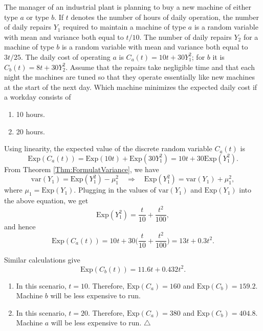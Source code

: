 \begin{example}
The manager of an industrial plant is planning to buy a new machine of either type $a$ or type $b$. If $t$ denotes the number of hours of daily operation, the number of daily repairs $Y_1$ required to maintain a machine of type $a$ is a random variable with mean and variance both equal to $t/10$. The number of daily repairs $Y_2$ for a machine of type $b$ is a random variable with mean and variance both equal to $3t/25$. The daily cost of operating $a$ is $C_a (t) = 10t + 30Y_1^2$; for $b$ it is $C_b(t) = 8t + 30 Y_2^2$. Assume that the repairs take negligible time and that each night the machines are tuned so that they operate essentially like new machines at the start of the next day. Which machine minimizes the expected daily cost if a workday consists of
    \begin{enumerate}[label=\alph*)]
    \item 10 hours.
    \item 20 hours.
    \end{enumerate}
\end{example}
\begin{sol*}
Using linearity, the expected value of the discrete random variable $C_a(t)$ is
\[
    \mathrm{Exp} (C_a (t)) = \mathrm{Exp} (10t) + \mathrm{Exp} (30 Y_1^2) = 10t + 30 \mathrm{Exp} (Y_1^2) .
\]
From Theorem \ref{Thm:FormulatVariance}, we have
\[
    \mathrm{var} (Y_1) = \mathrm{Exp} (Y_1^2) - \mu_1^2 \quad \Rightarrow \quad \mathrm{Exp} (Y_1^2) = \mathrm{var} (Y_1) + \mu_1^2 ,
\]
where $\mu_1 = \mathrm{Exp} (Y_1)$. Plugging in the values of $\mathrm{var} (Y_1)$ and $\mathrm{Exp} (Y_1)$ into the above equation, we get
\[
    \mathrm{Exp} (Y_1^2) = \frac{t}{10} + \frac{t^2}{100},
\]
and hence
\[
    \mathrm{Exp} (C_a (t)) = 10t + 30 \Big( \frac{t}{10} + \frac{t^2}{100} \Big) = 13 t + 0.3 t^2 .
\]

Similar calculations give
\[
    \mathrm{Exp} (C_b (t)) = 11.6t + 0.432 t^2 .
\]
\begin{enumerate}[label=\alph*)]
    \item In this scenario, $t = 10$. Therefore, $\mathrm{Exp} (C_a) = 160$ and $\mathrm{Exp} (C_b) = 159.2$. Machine $b$ will be less expensive to run.
    \item In this scenario, $t = 20$. Therefore, $\mathrm{Exp} (C_a) = 380$ and $\mathrm{Exp} (C_b) = 404.8$. Machine $a$ will be less expensive to run. \hfill $\triangle$
\end{enumerate}
\end{sol*}

